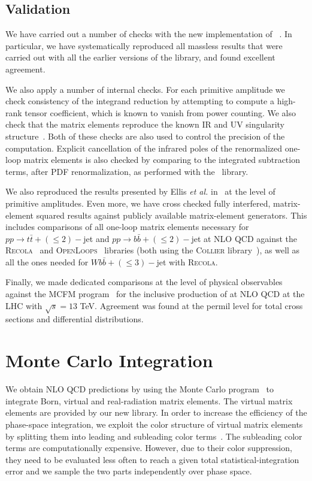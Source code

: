 \subsection{Validation}
We have carried out a number of checks with the new implementation of \BlackHat{}~\cite{BlackHatII}.
In particular, we have systematically reproduced all massless results
that were carried out with all the earlier versions of the library, and found
excellent agreement.

We also apply a number of internal checks. For each primitive amplitude we
check consistency of the integrand reduction by attempting to compute a
high-rank tensor coefficient, which is known to vanish from power counting. We
also check that the matrix elements reproduce the known IR and UV singularity structure~\cite{Catani:2000ef}. Both
of these checks are also used to control the precision of the computation.
Explicit cancellation of the infrared poles of the renormalized one-loop matrix
elements is also checked by comparing to the integrated subtraction terms, after
PDF renormalization, as performed with the~\SHERPA{} library.

We also reproduced the results presented by Ellis \textit{et al.}
in~\cite{Ellis:2008ir} at the level of primitive amplitudes. Even more, we have
cross checked fully interfered, matrix-element squared results against
publicly available matrix-element generators. This includes comparisons of all
one-loop matrix elements necessary for $pp\rightarrow t\bar t+(\leq 2)-$jet and
$pp\rightarrow b\bar b+(\leq 2)-$jet at NLO QCD against the
\textsc{Recola}~\cite{Actis:2016mpe} and
\textsc{OpenLoops}~\cite{Cascioli:2011va} libraries (both using the
\textsc{Collier} library~\cite{Denner:2016kdg}), as well as all the ones needed
for $Wb\bar b+(\leq3)-$jet with \textsc{Recola}.

Finally, we made dedicated comparisons at the level of physical observables
against the MCFM program~\cite{mcfm7} for the inclusive production of \Wbb{}
at NLO QCD at the LHC with $\sqrt{s}=13$ TeV. Agreement was found at the permil level for total cross sections
and differential distributions.






\section{Monte Carlo Integration}

We obtain NLO QCD predictions by using the \SHERPA{} 
Monte Carlo program~\cite{Sherpa} to integrate Born, virtual and real-radiation
matrix elements. The virtual matrix elements are provided by our new \BlackHat{} library. In order to increase the efficiency of the phase-space integration, we exploit the color structure of virtual matrix
elements by splitting them into leading and subleading color
terms~\cite{BH:W3jDistributions,Ita:2011ar}. The subleading color terms are computationally expensive. However, due to their color suppression, they need to be evaluated less often to reach a
given total statistical-integration error and we sample the two parts independently over
phase space.

